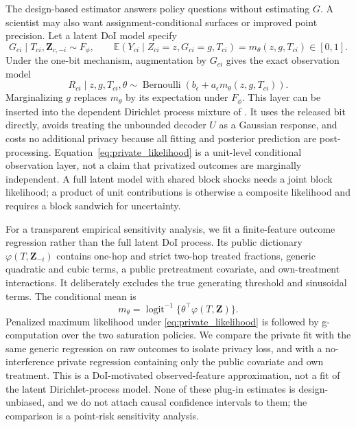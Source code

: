 \documentclass[10pt]{article}
\theoremstyle{definition}
\theoremstyle{remark}
\newcommand{\E}{\mathbb{E}}
\newcommand{\doisig}{a_{\epsilon}}
\DeclareMathOperator{\Bern}{Bernoulli}
\begin{document}
The design-based estimator answers policy questions without estimating $G$. A scientist may
also want assignment-conditional surfaces or improved point precision. Let a latent DoI model
specify
\[
  G_{ci}\mid T_{ci},\mathbf Z_{c,-i}\sim F_{\phi},
  \qquad
  \E(Y_{ci}\mid Z_{ci}=z,G_{ci}=g,T_{ci})=m_{\theta}(z,g,T_{ci})\in[0,1].
\]
Under the one-bit mechanism, augmentation by $G_{ci}$ gives the exact observation model
\begin{equation}
  R_{ci}\mid z,g,T_{ci},\theta
  \sim\Bern\!\left(b_{\epsilon}+\doisig m_{\theta}(z,g,T_{ci})\right).
  \label{eq:private_likelihood}
\end{equation}
Marginalizing $g$ replaces $m_{\theta}$ by its expectation under $F_{\phi}$. This layer can be
inserted into the dependent Dirichlet process mixture of
\citet{OhnishiKarmakarSabbaghi2025}. It uses the released bit directly, avoids treating the
unbounded decoder $U$ as a Gaussian response, and costs no additional privacy because all
fitting and posterior prediction are post-processing. Equation~\eqref{eq:private_likelihood}
is a unit-level conditional observation layer, not a claim that privatized outcomes are
marginally independent. A full latent model with shared block shocks needs a joint block
likelihood; a product of unit contributions is otherwise a composite likelihood and requires a
block sandwich for uncertainty.

For a transparent empirical sensitivity analysis, we fit a finite-feature outcome regression
rather than the full latent DoI process. Its public dictionary
$\varphi(T,\mathbf Z_{-i})$ contains one-hop and strict two-hop treated fractions, generic
quadratic and cubic terms, a public pretreatment covariate, and own-treatment interactions.
It deliberately excludes the true generating threshold and sinusoidal terms. The conditional
mean is
\[
  m_{\theta}=\operatorname{logit}^{-1}\{\theta^\top\varphi(T,\mathbf Z)\}.
\]
Penalized maximum likelihood under \eqref{eq:private_likelihood} is followed by
g-computation over the two saturation policies. We compare the private fit with the same
generic regression on raw outcomes to isolate privacy loss, and with a no-interference private
regression containing only the public covariate and own treatment. This is a DoI-motivated
observed-feature approximation, not a fit of the latent Dirichlet-process model. None of these
plug-in estimates is design-unbiased, and we do not attach causal confidence intervals to
them; the comparison is a point-risk sensitivity analysis.
\end{document}
